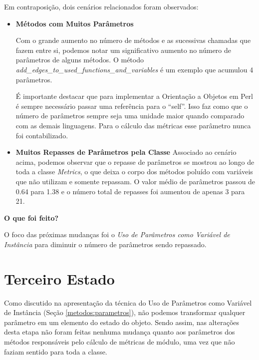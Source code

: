 

Em contraposição, dois cenários relacionados foram observados:

\begin{itemize}
\item
\textbf{Métodos com Muitos Parâmetros}

Com o grande aumento no número de métodos e as sucessivas chamadas que fazem entre si,
podemos notar um significativo aumento no número de parâmetros de alguns métodos.
O método \textit{add\_edges\_to\_used\_functions\_and\_variables} é um exemplo que acumulou
4 parâmetros.

É importante destacar que para implementar a Orientação a Objetos em Perl é sempre necessário
passar uma referência para o ``self''. Isso faz como que o número de parâmetros sempre
seja uma unidade maior quando comparado com as demais linguagens. Para o cálculo das métricas
esse parâmetro nunca foi contabilizado.



\item
\textbf{Muitos Repasses de Parâmetros pela Classe}
Associado ao cenário acima, podemos observar que o repasse de parâmetros se mostrou
ao longo de toda a classe \textit{Metrics}, o que deixa o corpo dos métodos poluído
com variáveis que não utilizam e somente repassam. O valor médio de parâmetros
passou de 0.64 para 1.38 e o número total de repasses foi aumentou de apenas 3 para 21.


\end{itemize}

\vskip 1.0cm
\textbf{O que foi feito?}

O foco das próximas mudanças foi o \textit{Uso de Parâmetros como Variável de Instância} para diminuir
o número de parâmetros sendo repassado.

\section{Terceiro Estado}

Como discutido na apresentação da técnica do Uso de Parâmetros como Variável de
Instância (Seção \ref{metodos:parametros}), não podemos transformar qualquer parâmetro em 
um elemento do estado do objeto. Sendo assim, nas alterações desta etapa não foram feitas
nenhuma mudança quanto aos parâmetros dos métodos responsáveis pelo cálculo de métricas
de módulo, uma vez que não faziam sentido para toda a classe.

